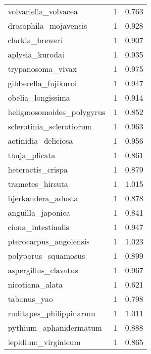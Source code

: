 \begin{tabular}{lrr}
           volvariella\_volvacea &                   1 &     0.763 \\
          drosophila\_mojavensis &                   1 &     0.928 \\
                clarkia\_breweri &                   1 &     0.907 \\
                aplysia\_kurodai &                   1 &     0.935 \\
              trypanosoma\_vivax &                   1 &     0.975 \\
           gibberella\_fujikuroi &                   1 &     0.947 \\
              obelia\_longissima &                   1 &     0.914 \\
      heligmosomoides\_polygyrus &                   1 &     0.852 \\
       sclerotinia\_sclerotiorum &                   1 &     0.963 \\
            actinidia\_deliciosa &                   1 &     0.956 \\
                  thuja\_plicata &                   1 &     0.861 \\
              heteractis\_crispa &                   1 &     0.879 \\
               trametes\_hirsuta &                   1 &     1.015 \\
             bjerkandera\_adusta &                   1 &     0.878 \\
              anguilla\_japonica &                   1 &     0.841 \\
             ciona\_intestinalis &                   1 &     0.947 \\
         pterocarpus\_angolensis &                   1 &     1.023 \\
            polyporus\_squamosus &                   1 &     0.899 \\
           aspergillus\_clavatus &                   1 &     0.967 \\
                nicotiana\_alata &                   1 &     0.621 \\
                    tabanus\_yao &                   1 &     0.798 \\
        ruditapes\_philippinarum &                   1 &     1.011 \\
         pythium\_aphanidermatum &                   1 &     0.888 \\
            lepidium\_virginicum &                   1 &     0.865 \\

\end{tabular}
